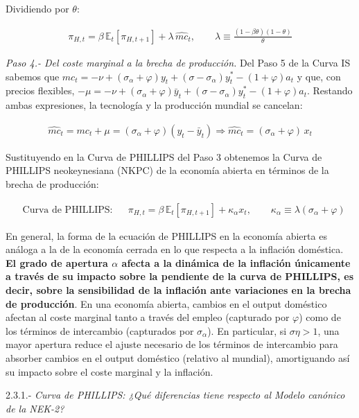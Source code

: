 \documentclass[10pt,a4paper]{article}
\begin{document}
Dividiendo por $\theta$:

$$\begin{aligned}
    \boxed{\pi_{H,t}=\beta\,\mathbb E_t[\pi_{H,t+1}]+\lambda\,\widehat{mc}_t},\qquad \lambda\equiv\frac{(1-\beta\theta)(1-\theta)}{\theta}
\end{aligned}$$

\textit{Paso 4.- Del coste marginal a la brecha de producción.} Del Paso 5 de la Curva IS sabemos que $mc_t=-\nu+(\sigma_\alpha+\varphi)y_t+(\sigma-\sigma_\alpha)y_t^*-(1+\varphi)a_t$ y que, con precios flexibles, $-\mu=-\nu+(\sigma_\alpha+\varphi)\bar y_t+(\sigma-\sigma_\alpha)y_t^*-(1+\varphi)a_t$. Restando ambas expresiones, la tecnología y la producción mundial se cancelan:

$$\begin{aligned}
    \widehat{mc}_t=mc_t+\mu=(\sigma_\alpha+\varphi)(y_t-\bar y_t)\Longrightarrow\boxed{\widehat{mc}_t=(\sigma_\alpha+\varphi)\,x_t}
\end{aligned}$$

Sustituyendo en la Curva de PHILLIPS del Paso 3 obtenemos la Curva de PHILLIPS neokeynesiana (NKPC) de la economía abierta en términos de la brecha de producción:

$$\begin{aligned}
    &\text{Curva de PHILLIPS}:&&\boxed{\pi_{H,t} = \beta\,\mathbb E_t[\pi_{H,t+1}] + \kappa_\alpha x_t},\qquad \kappa_\alpha\equiv\lambda(\sigma_\alpha+\varphi)
\end{aligned}$$

En general, la forma de la ecuación de PHILLIPS en la economía abierta es análoga a la de la economía cerrada en lo que respecta a la inflación doméstica. \textbf{El grado de apertura $\alpha$ afecta a la dinámica de la inflación únicamente a través de su impacto sobre la pendiente de la curva de PHILLIPS, es decir, sobre la sensibilidad de la inflación ante variaciones en la brecha de producción}. En una economía abierta, cambios en el output doméstico afectan al coste marginal tanto a través del empleo (capturado por $\varphi$) como de los términos de intercambio (capturados por $\sigma_\alpha$). En particular, si $\sigma\eta > 1$, una mayor apertura reduce el ajuste necesario de los términos de intercambio para absorber cambios en el output doméstico (relativo al mundial), amortiguando así su impacto sobre el coste marginal y la inflación.


2.3.1.- \textit{Curva de PHILLIPS: ¿Qué diferencias tiene respecto al Modelo canónico de la NEK-2?}
\end{document}
